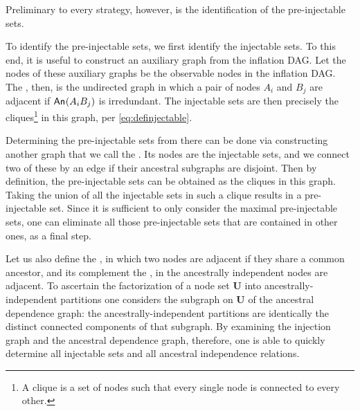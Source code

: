 Preliminary to every strategy, however, is the identification of the pre-injectable sets.


\label{step:findpreinjectable}

To identify the pre-injectable sets, we first identify the injectable sets. To this end, it is useful to construct an auxiliary graph from the inflation DAG. Let the nodes of these auxiliary graphs be the observable nodes in the inflation DAG. The , then, is the undirected graph in which a pair of nodes $A_i$ and $B_j$ are adjacent if  ${\mathsf{An}_{}}\lparen A_i B_j\rparen$ is irredundant. The injectable sets are then precisely the cliques\footnote{A clique is a set of nodes such that every single node is connected to every other.} in this graph, per \cref{eq:definjectable}. 

Determining the pre-injectable sets from there can be done via constructing another graph that we call the . Its nodes are the injectable sets, and we connect two of these by an edge if their ancestral subgraphs are disjoint. Then by definition, the pre-injectable sets can be obtained as the cliques in this graph. Taking the union of all the injectable sets in such a clique results in a pre-injectable set. Since it is sufficient to only consider the maximal pre-injectable sets, one can eliminate all those pre-injectable sets that are contained in other ones, as a final step.

Let us also define the , in which two nodes are adjacent if they share a common ancestor, and its complement the , in the ancestrally independent nodes are adjacent. To ascertain the factorization of a node set $\bm{U}$ into ancestrally-independent partitions one considers the subgraph on  $\bm{U}$ of the ancestral dependence graph: the ancestrally-independent partitions are identically the distinct connected components of that subgraph. By examining the injection graph and the ancestral dependence graph, therefore, one is able to quickly determine all injectable sets and all ancestral independence relations.

